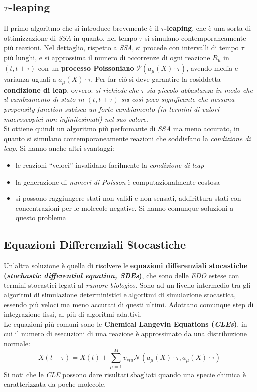 \documentclass[a4paper,12pt, oneside]{book}
\begin{document}
\subsection{$\tau$-leaping}
Il primo algoritmo che si introduce brevemente è il \textbf{$\tau$-leaping}, che
è una sorta di ottimizzazione di \textit{SSA} in quanto, nel tempo $\tau$ si
simulano contemporaneamente più reazioni. Nel dettaglio, rispetto a
\textit{SSA}, si procede con intervalli di tempo $\tau$ più lunghi, e si
approssima il numero di occorrenze di ogni reazione $R_\mu$ in $(t, t+\tau)$ con
un \textbf{processo Poissoniano} $\mathcal{P}(a_\mu(X)\cdot \tau)$, avendo media
e varianza uguali a $a_\mu(X)\cdot \tau$. Per far ciò si deve garantire la
cosiddetta \textbf{condizione di leap}, ovvero: \textit{si richiede che $\tau$
  sia piccolo abbastanza in modo che il cambiamento di stato in $(t, t+\tau)$
  sia così poco significante che nessuna \textit{propensity function} subisca un
  forte cambiamento (in termini di valori macroscopici non infinitesimali) nel
  suo valore}. \\
Si ottiene quindi un algoritmo più performante di \textit{SSA} ma meno accurato,
in quanto si simulano contemporaneamente reazioni che soddisfano la
\textit{condizione di leap}. Si hanno anche altri svantaggi:
\begin{itemize}
  \item le reazioni ``veloci'' invalidano facilmente la \textit{condizione di
    leap}
  \item la generazione di \textit{numeri di Poisson} è computazionalmente
  costosa
  \item si possono raggiungere stati non validi e non sensati, addirittura stati
  con concentrazioni per le molecole negative. Si hanno comunque soluzioni a
  questo problema
\end{itemize}
\subsection{Equazioni Differenziali Stocastiche}
Un'altra soluzione è quella di risolvere le \textbf{equazioni differenziali
  stocastiche (\textit{stochastic differential equation, SDEs})}, che sono delle
\textit{EDO} estese con termini stocastici legati al \textit{rumore
  biologico}. Sono ad un livello intermedio tra gli algoritmi di simulazione
deterministici e algoritmi di simulazione stocastica, essendo più veloci ma meno
accurati di questi ultimi. Adottano comunque step di integrazione fissi, al più
di algoritmi adattivi.\\
Le equazioni più comuni sono le \textbf{Chemical Langevin Equations
  (\textit{CLEs})}, in cui il numero di esecuzioni di una reazione è
approssimato da una distribuzione normale:
\[X(t+\tau)=X(t)+\sum_{\mu=1}^Mv_{mu}\mathcal{N}(a_\mu(X)\cdot \tau,
  a_\mu(X)\cdot \tau)\]
Si noti che le \textit{CLE} possono dare  risultati sbagliati quando una specie
chimica è caratterizzata da poche molecole.
\end{document}
